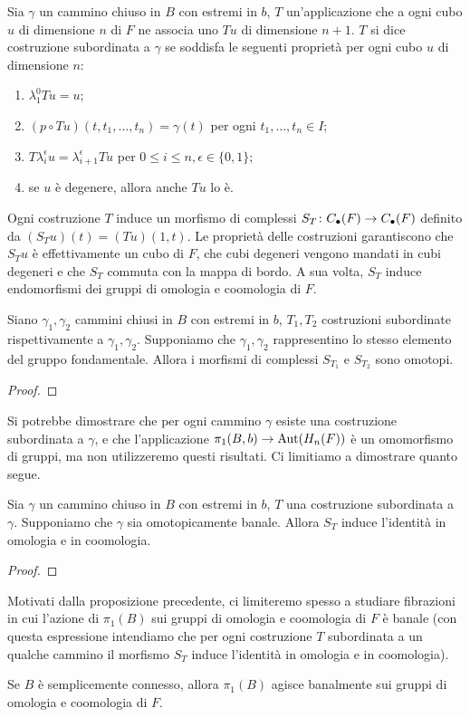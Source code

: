 \begin{definition}
Sia $\gamma$ un cammino chiuso in $B$ con estremi in $b$, $T$ un'applicazione che a ogni cubo $u$ di dimensione $n$ di $F$ ne associa uno $Tu$ di dimensione $n+1$. $T$ si dice costruzione subordinata a $\gamma$ se soddisfa le seguenti proprietà per ogni cubo $u$ di dimensione $n$:
\begin{enumerate}
\item $\lambda^0_1 Tu=u$;
\item $(p\circ Tu)(t,t_1,\ldots,t_n)=\gamma(t)$ per ogni $t_1,\ldots,t_n\in I$;
\item $T\lambda^\epsilon_iu=\lambda^\epsilon_{i+1}Tu$ per $0\le i\le n,\epsilon\in\{0,1\}$;
\item se $u$ è degenere, allora anche $Tu$ lo è.
\end{enumerate}
\end{definition}
Ogni costruzione $T$ induce un morfismo di complessi $S_T\colon C_\bullet(F)\to C_\bullet(F)$ definito da $(S_Tu)(t)=(Tu)(1,t)$. Le proprietà delle costruzioni garantiscono che $S_Tu$ è effettivamente un cubo di $F$, che cubi degeneri vengono mandati in cubi degeneri e che $S_T$ commuta con la mappa di bordo. A sua volta, $S_T$ induce endomorfismi dei gruppi di omologia e coomologia di $F$.
\begin{proposition}
Siano $\gamma_1,\gamma_2$ cammini chiusi in $B$ con estremi in $b$, $T_1,T_2$ costruzioni subordinate rispettivamente a $\gamma_1,\gamma_2$. Supponiamo che $\gamma_1,\gamma_2$ rappresentino lo stesso elemento del gruppo fondamentale. Allora i morfismi di complessi $S_{T_1}$ e $S_{T_2}$ sono omotopi.
\end{proposition}
\begin{proof}

\end{proof}
Si potrebbe dimostrare che per ogni cammino $\gamma$ esiste una costruzione subordinata a $\gamma$, e che l'applicazione $\pi_1(B,b)\to\operatorname{Aut}(H_n(F))$ è un omomorfismo di gruppi, ma non utilizzeremo questi risultati.  
Ci limitiamo a dimostrare quanto segue.
\begin{proposition}
Sia $\gamma$ un cammino chiuso in $B$ con estremi in $b$, $T$ una costruzione subordinata a $\gamma$. Supponiamo che $\gamma$ sia omotopicamente banale. Allora $S_T$ induce l'identità in omologia e in coomologia.
\end{proposition}
\begin{proof}

\end{proof}
Motivati dalla proposizione precedente, ci limiteremo spesso a studiare fibrazioni in cui l'azione di $\pi_1(B)$ sui gruppi di omologia e coomologia di $F$ è banale (con questa espressione intendiamo che per ogni costruzione $T$ subordinata a un qualche cammino il morfismo $S_T$ induce l'identità in omologia e in coomologia).
\begin{corollary}
Se $B$ è semplicemente connesso, allora $\pi_1(B)$ agisce banalmente sui gruppi di omologia e coomologia di $F$.
\end{corollary}

